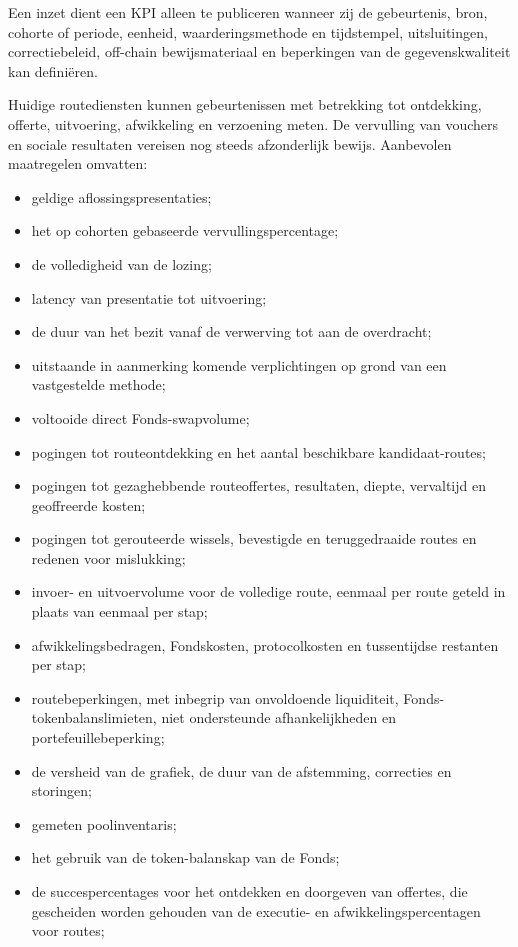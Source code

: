\documentclass[11pt]{article}
\begin{document}
Een inzet dient een KPI alleen te publiceren wanneer zij de gebeurtenis, bron, cohorte of periode, eenheid, waarderingsmethode en tijdstempel, uitsluitingen, correctiebeleid, off-chain bewijsmateriaal en beperkingen van de gegevenskwaliteit kan definiëren.

Huidige routediensten kunnen gebeurtenissen met betrekking tot ontdekking, offerte, uitvoering, afwikkeling en verzoening meten. De vervulling van vouchers en sociale resultaten vereisen nog steeds afzonderlijk bewijs. Aanbevolen maatregelen omvatten:

\begin{itemize}[leftmargin=*]
\item geldige aflossingspresentaties;
\item het op cohorten gebaseerde vervullingspercentage;
\item de volledigheid van de lozing;
\item latency van presentatie tot uitvoering;
\item de duur van het bezit vanaf de verwerving tot aan de overdracht;
\item uitstaande in aanmerking komende verplichtingen op grond van een vastgestelde methode;
\item voltooide direct Fonds-swapvolume;
\item pogingen tot routeontdekking en het aantal beschikbare kandidaat-routes;
\item pogingen tot gezaghebbende routeoffertes, resultaten, diepte, vervaltijd en geoffreerde kosten;
\item pogingen tot gerouteerde wissels, bevestigde en teruggedraaide routes en redenen voor mislukking;
\item invoer- en uitvoervolume voor de volledige route, eenmaal per route geteld in plaats van eenmaal per stap;
\item afwikkelingsbedragen, Fondskosten, protocolkosten en tussentijdse restanten per stap;
\item routebeperkingen, met inbegrip van onvoldoende liquiditeit, Fonds-tokenbalanslimieten, niet ondersteunde afhankelijkheden en portefeuillebeperking;
\item de versheid van de grafiek, de duur van de afstemming, correcties en storingen;
\item gemeten poolinventaris;
\item het gebruik van de token-balanskap van de Fonds;
\item de succespercentages voor het ontdekken en doorgeven van offertes, die gescheiden worden gehouden van de executie- en afwikkelingspercentagen voor routes;

\end{itemize}
\end{document}

